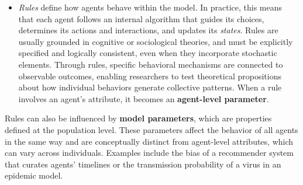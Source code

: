 \documentclass[11pt]{article}
\begin{document}
\begin{itemize}
    \item \textit{Rules} define how agents behave within the model. In practice, this means that each agent follows an internal algorithm that guides its choices, determines its actions and interactions, and updates its \textit{states}. 
    Rules are usually grounded in cognitive or sociological theories, 
    and must be explicitly specified and logically consistent, even when they incorporate stochastic elements. 
    Through rules, specific behavioral mechanisms are connected to observable outcomes, enabling researchers to test theoretical propositions about how individual behaviors generate collective patterns. When a rule involves an agent's attribute, it becomes an \textbf{agent-level parameter}.
    
\end{itemize}

\smallskip \noindent Rules can also be influenced by \textbf{model parameters}, which are properties defined at the population level. 
These parameters affect the behavior of all agents in the same way and are conceptually distinct from agent-level attributes, which can vary across individuals. 
Examples include the bias of a recommender system that curates agents' timelines or the transmission probability of a virus in an epidemic model. 
\end{document}
